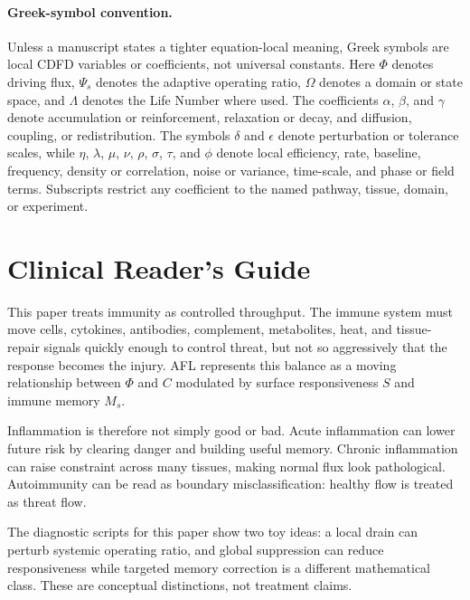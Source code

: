 \documentclass[12pt,a4paper]{article}
\begin{document}
\paragraph{Greek-symbol convention.}
Unless a manuscript states a tighter equation-local meaning, Greek symbols are local CDFD variables or coefficients, not universal constants. Here $\Phi$ denotes driving flux, $\Psi_s$ denotes the adaptive operating ratio, $\Omega$ denotes a domain or state space, and $\Lambda$ denotes the Life Number where used. The coefficients $\alpha$, $\beta$, and $\gamma$ denote accumulation or reinforcement, relaxation or decay, and diffusion, coupling, or redistribution. The symbols $\delta$ and $\epsilon$ denote perturbation or tolerance scales, while $\eta$, $\lambda$, $\mu$, $\nu$, $\rho$, $\sigma$, $\tau$, and $\phi$ denote local efficiency, rate, baseline, frequency, density or correlation, noise or variance, time-scale, and phase or field terms. Subscripts restrict any coefficient to the named pathway, tissue, domain, or experiment.

\section*{Clinical Reader's Guide}
This paper treats immunity as controlled throughput. The immune system must move cells, cytokines, antibodies, complement, metabolites, heat, and tissue-repair signals quickly enough to control threat, but not so aggressively that the response becomes the injury. AFL represents this balance as a moving relationship between $\Phi$ and $C$ modulated by surface responsiveness $S$ and immune memory $M_s$.

Inflammation is therefore not simply good or bad. Acute inflammation can lower future risk by clearing danger and building useful memory. Chronic inflammation can raise constraint across many tissues, making normal flux look pathological. Autoimmunity can be read as boundary misclassification: healthy flow is treated as threat flow.

The diagnostic scripts for this paper show two toy ideas: a local drain can perturb systemic operating ratio, and global suppression can reduce responsiveness while targeted memory correction is a different mathematical class. These are conceptual distinctions, not treatment claims.


\vspace{0.5em}\noindent{}
\vspace{0.75em}
\end{document}
